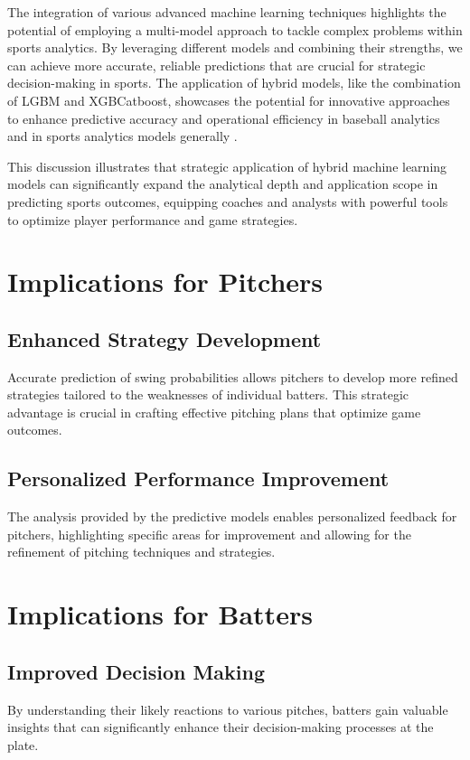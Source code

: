 \documentclass[12pt]{article}
\begin{document}
The integration of various advanced machine learning techniques highlights the potential of employing a multi-model approach to tackle complex problems within sports analytics. By leveraging different models and combining their strengths, we can achieve more accurate, reliable predictions that are crucial for strategic decision-making in sports. The application of hybrid models, like the combination of LGBM and XGBCatboost, showcases the potential for innovative approaches to enhance predictive accuracy and operational efficiency in baseball analytics and in sports analytics models generally .

This discussion illustrates that strategic application of hybrid machine learning models can significantly expand the analytical depth and application scope in predicting sports outcomes, equipping coaches and analysts with powerful tools to optimize player performance and game strategies.

\section{Implications for Pitchers}
\subsection*{Enhanced Strategy Development}
Accurate prediction of swing probabilities allows pitchers to develop more refined strategies tailored to the weaknesses of individual batters. This strategic advantage is crucial in crafting effective pitching plans that optimize game outcomes.
\subsection*{Personalized Performance Improvement}
The analysis provided by the predictive models enables personalized feedback for pitchers, highlighting specific areas for improvement and allowing for the refinement of pitching techniques and strategies.

\section*{Implications for Batters}
\subsection*{Improved Decision Making}
By understanding their likely reactions to various pitches, batters gain valuable insights that can significantly enhance their decision-making processes at the plate.
\end{document}
